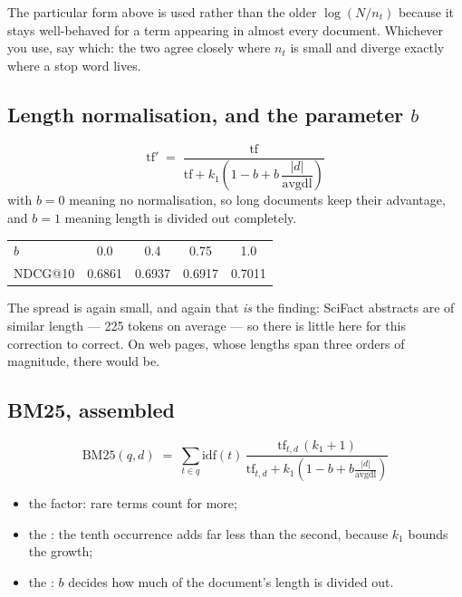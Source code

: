 \documentclass[11pt,a4paper]{article}
\begin{document}
The particular form above is used rather than the older $\log(N/n_t)$ because
it stays well-behaved for a term appearing in almost every document. Whichever
you use, say which: the two agree closely where $n_t$ is small and diverge
exactly where a stop word lives.

\subsection{Length normalisation, and the parameter $b$}

\[
  \text{tf}' \;=\; \frac{\text{tf}}
  {\text{tf} + k_1\!\left(1 - b + b\,\dfrac{|d|}{\text{avgdl}}\right)}
\]
with $b = 0$ meaning no normalisation, so long documents keep their advantage,
and $b = 1$ meaning length is divided out completely.

\begin{center}
\small
\begin{tabular}{lcccc}
\toprule
$b$      & 0.0 & 0.4 & 0.75 & 1.0 \\
NDCG@10  & 0.6861 & 0.6937 & 0.6917 & 0.7011 \\
\bottomrule
\end{tabular}
\end{center}

The spread is again small, and again that \emph{is} the finding: SciFact
abstracts are of similar length --- 225 tokens on average --- so there is
little here for this correction to correct. On web pages, whose lengths span
three orders of magnitude, there would be.

\subsection{BM25, assembled}

\begin{derivbox}[title={BM25}]
\[
  \text{BM25}(q,d) \;=\; \sum_{t \in q} \mathrm{idf}(t)\,
  \frac{\text{tf}_{t,d}\,(k_1+1)}
       {\text{tf}_{t,d} + k_1\!\left(1-b+b\frac{|d|}{\text{avgdl}}\right)}
\]
\begin{itemize}[leftmargin=*,nosep]
  \item the  factor: rare terms count for more;
  \item the : the tenth occurrence adds far less than the
        second, because $k_1$ bounds the growth;
  \item the : $b$ decides how much of the document's length
        is divided out.
\end{itemize}
\end{derivbox}
\end{document}
